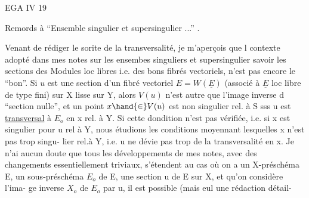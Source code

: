 
EGA IV 19

Remords à ``Ensemble singulier et supersingulier ...'' .

Venant de rédiger le sorite de la transversalité, je m'aperçois que l
contexte adopté dans mes notes sur les ensembes singuliers et supersingulier
savoir les sections des Modules loc libres i.e. des bons fibrés vectoriels,
n'est pas encore le ``bon''. Si $u$ est une section d'un fibré vectoriel
$E = W(\underline{E})$ (associé à $\underline{E}$ loc libre de type fini) sur X lisse sur Y, alors $V(u)$
n'est autre que l'image inverse d   ``section nulle'', et un point $x\hand{\in} V(u)$
est non singulier  rel. à S sss u est \uline{transversal} à $E_{o}$ en x rel. à Y.
Si cette dondition n'est pas vérifiée, i.e. si x est singulier pour u rel à
Y, nous étudions les conditions moyennant lesquelles x n'est pas trop singu-%
lier rel.à Y, i.e. u ne dévie pas trop de la transversalité en x. Je n'ai
aucun doute que tous les développements de mes notes, avec des changements
essentiellement triviaux, s'étendent au cas où on a un X-préschéma E, un
sous-préschéma $E_{o}$ de E, une section  u de E sur X, et qu'on considère l'ima-%
ge inverse $X_{o}$ de $E_{o}$ par u,  il est possible (mais eul une rédaction détail-%
